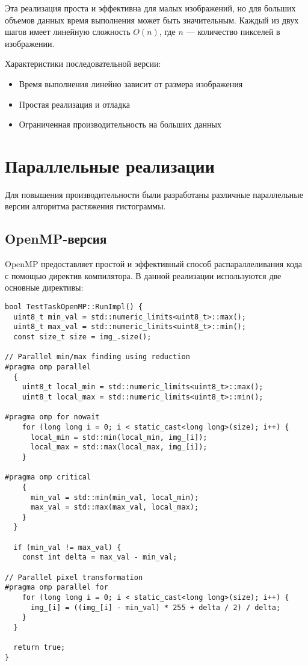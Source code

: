 \documentclass[a4paper,14pt]{article}
\begin{document}
Эта реализация проста и эффективна для малых изображений, но для больших объемов данных время выполнения может быть значительным. Каждый из двух шагов имеет линейную сложность $O(n)$, где $n$ — количество пикселей в изображении.

Характеристики последовательной версии:
\begin{itemize}
    \item Время выполнения линейно зависит от размера изображения
    \item Простая реализация и отладка
    \item Ограниченная производительность на больших данных
\end{itemize}

\section{Параллельные реализации}

Для повышения производительности были разработаны различные параллельные версии алгоритма растяжения гистограммы.

\subsection{OpenMP-версия}

OpenMP предоставляет простой и эффективный способ распараллеливания кода с помощью директив компилятора. В данной реализации используются две основные директивы:

\begin{lstlisting}[caption=Реализация с использованием OpenMP]
bool TestTaskOpenMP::RunImpl() {
  uint8_t min_val = std::numeric_limits<uint8_t>::max();
  uint8_t max_val = std::numeric_limits<uint8_t>::min();
  const size_t size = img_.size();

// Parallel min/max finding using reduction
#pragma omp parallel
  {
    uint8_t local_min = std::numeric_limits<uint8_t>::max();
    uint8_t local_max = std::numeric_limits<uint8_t>::min();

#pragma omp for nowait
    for (long long i = 0; i < static_cast<long long>(size); i++) {
      local_min = std::min(local_min, img_[i]);
      local_max = std::max(local_max, img_[i]);
    }

#pragma omp critical
    {
      min_val = std::min(min_val, local_min);
      max_val = std::max(max_val, local_max);
    }
  }

  if (min_val != max_val) {
    const int delta = max_val - min_val;

// Parallel pixel transformation
#pragma omp parallel for
    for (long long i = 0; i < static_cast<long long>(size); i++) {
      img_[i] = ((img_[i] - min_val) * 255 + delta / 2) / delta;
    }
  }

  return true;
}
\end{lstlisting}
\end{document}
